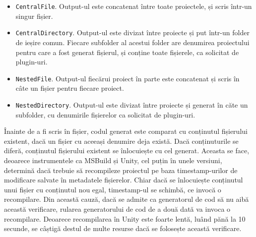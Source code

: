 \documentclass[a4paper,12pt]{report}
\begin{document}
\begin{itemize}
\item \texttt{CentralFile}. Output-ul este concatenat între toate proiectele, și scris într-un singur fișier.


\item \texttt{CentralDirectory}. Output-ul este divizat între proiecte și put într-un folder de ieșire comun.
  Fiecare subfolder al acestui folder are denumirea proiectului pentru care a fost generat fișierul, și conține toate fișierele, ca solicitat de plugin-uri.


\item \texttt{NestedFile}. Output-ul fiecărui proiect în parte este concatenat și scris în câte un fișier pentru fiecare proiect.


\item \texttt{NestedDirectory}. Output-ul este divizat între proiecte și generat în căte un subfolder, cu denumirile fișierelor ca solicitat de plugin-uri.

\end{itemize}

Înainte de a fi scris în fișier, codul generat este comparat cu conținutul fișierului existent, dacă un fișier cu aceeași denumire deja există.
Dacă conținuturile se diferă, conținutul fișierului existent se înlocuiește cu cel generat.
Aceasta se face, deoarece instrumentele ca MSBuild și Unity, cel puțin în unele versiuni, determină dacă trebuie să recompileze proiectul pe baza timestamp-urilor de modificare salvate în metadatele fișierelor.
Chiar dacă se înlocuiește conținutul unui fișier cu conținutul nou egal, timestamp-ul se schimbă, ce invocă o recompilare.
Din această cauză, dacă se admite ca generatorul de cod să nu aibă această verificare, rularea generatorului de cod de a două dată va invoca o recompilare.
Deoarece recompilarea în Unity este foarte lentă, luând pănă la 10 secunde, se câștigă destul de multe resurse dacă se folosește această verificare.


\end{document}

